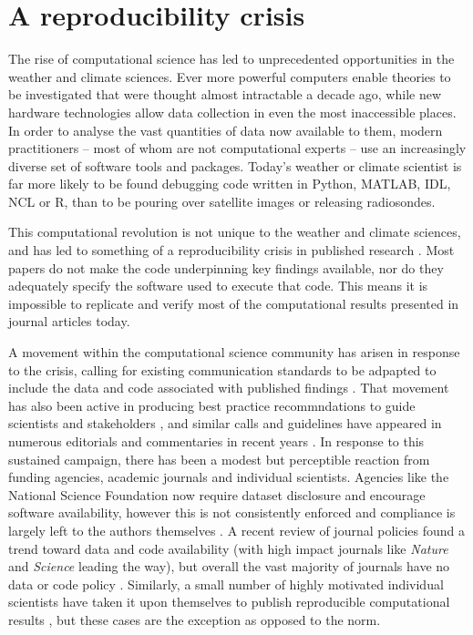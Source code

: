 \section{A reproducibility crisis}
The rise of computational science has led to unprecedented opportunities in the weather and climate sciences. Ever more powerful computers enable theories to be investigated that were thought almost intractable a decade ago, while new hardware technologies allow data collection in even the most inaccessible places. In order to analyse the vast quantities of data now available to them, modern practitioners – most of whom are not computational experts – use an increasingly diverse set of software tools and packages. Today's weather or climate scientist is far more likely to be found debugging code written in Python, MATLAB, IDL, NCL or R, than to be pouring over satellite images or releasing radiosondes. 

This computational revolution is not unique to the weather and climate sciences, and has led to something of a reproducibility crisis in published research \citep[e.g.][]{Peng2011}. Most papers do not make the code underpinning key findings available, nor do they adequately specify the software used to execute that code. This means it is impossible to replicate and verify most of the computational results presented in journal articles today.

A movement within the computational science community has arisen in response to the crisis, calling for existing communication standards to be adpapted to include the data and code associated with published findings \citep[e.g.][]{Stodden2014}. That movement has also been active in producing best practice recommndations to guide scientists and stakeholders \citep[e.g.][]{Stodden2012a,Stodden2014,Wilson2014}, and similar calls and guidelines have appeared in numerous editorials and commentaries in recent years \citep[e.g.][]{Barnes2010,Ince2012,Merali2010}. In response to this sustained campaign, there has been a modest but perceptible reaction from funding agencies, academic journals and individual scientists. Agencies like the National Science Foundation now require dataset disclosure and encourage software availability, however this is not consistently enforced and compliance is largely left to the authors themselves \citep{Stodden2013}. A recent review of journal policies found a trend toward data and code availability (with high impact journals like \textit{Nature} and \textit{Science} leading the way), but overall the vast majority of journals have no data or code policy \citep{Stodden2013}. Similarly, a small number of highly motivated individual scientists have taken it upon themselves to publish reproducible computational results \citep[e.g.][]{Crooks2014,Ketcheson2012,Schmitt2015}, but these cases are the exception as opposed to the norm.

